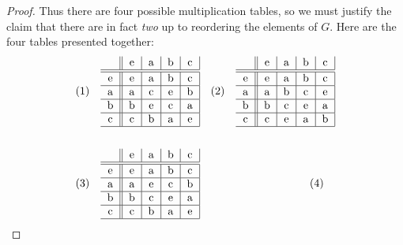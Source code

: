 \documentclass{article}
\theoremstyle{definition}
\begin{document}
\begin{proof}
	Thus there are four possible multiplication tables, so we must justify the claim that there are in fact \textit{two} up to reordering the elements of $G$.
	Here are the four tables presented together: \begin{align*}
		 & (1)\hspace{1em} \begin{tabular}{ c || c | c | c | c | }
			                     & e & a & b & c \\ \hline\hline
			                   e & e & a & b & c \\ \hline
			                   a & a & c & e & b \\ \hline
			                   b & b & e & c & a \\ \hline
			                   c & c & b & a & e \\ \hline
		                   \end{tabular} & (2)\hspace{1em} \begin{tabular}{ c || c | c | c | c | }
			                                                     & e & a & b & c \\ \hline\hline
			                                                   e & e & a & b & c \\ \hline
			                                                   a & a & b & c & e \\ \hline
			                                                   b & b & c & e & a \\ \hline
			                                                   c & c & e & a & b \\ \hline
		                                                   \end{tabular} \\
		\\
		 & (3)\hspace{1em} \begin{tabular}{ c || c | c | c | c | }
			                     & e & a & b & c \\ \hline\hline
			                   e & e & a & b & c \\ \hline
			                   a & a & e & c & b \\ \hline
			                   b & b & c & e & a \\ \hline
			                   c & c & b & a & e \\ \hline
		                   \end{tabular} & (4)\hspace{1em} \begin{tabular}{ c || c | c | c | c | }

\end{tabular}
\end{align*}
\end{proof}
\end{document}
